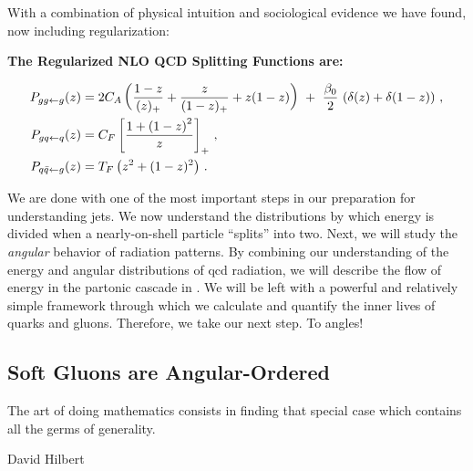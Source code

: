 With a combination of physical intuition and sociological evidence we have found, now including regularization:
\begin{answer}
    \begin{center}
        {\normalfont\Large\bfseries\sffamily The Regularized NLO QCD Splitting Functions are:}
    \end{center}

    \begin{subequations}
    \begin{align}
        \label{eq:p_gtogg}
        P_{gg \leftarrow g}(z)
        &=
        2C_A \le(
            \frac{1-z}{(z)_+}
            +
            \frac{z}{(1-z)_+}
            +
            z(1-z)
        \ri)
        \,\,
        +
        \,\,
        \frac{\beta_0}{2}
        \,
        \le(\delta(z) + \delta(1-z)\ri)
        \,,
        \\
        \label{eq:p_qtogq}
        P_{gq \leftarrow q}(z)
        &=
        C_F \le[\frac{1+\le(1-z\ri)^2}{z}\ri]_+
        \,,
        \\
        \label{eq:p_gtoqq}
        P_{q\bar{q} \leftarrow g}(z)
        &=
        T_F \left(z^2 + (1-z)^2\right)
        \,.
    \end{align}
    \end{subequations}
\end{answer}


We are done with one of the most important steps in our preparation for understanding jets.
%
We now understand the distributions by which energy is divided when a nearly-on-shell particle ``splits'' into two.
%
Next, we will study the \textit{angular} behavior of radiation patterns.
%
By combining our understanding of the energy and angular distributions of \gls{qcd} radiation, we will describe the flow of energy in the partonic cascade in .
%
We will be left with a powerful and relatively simple framework through which we calculate and quantify the inner lives of quarks and gluons.
%
Therefore, we take our next step.
%
To angles!


\subsection{Soft Gluons are Angular-Ordered}
\label{sec:soft-gluons}

\epigraph{The art of doing mathematics consists in finding that special case which contains all the germs of generality.}{David Hilbert}

